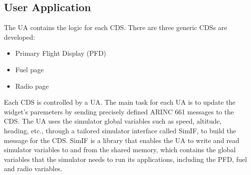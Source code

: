     \subsection{User Application}
        The UA contains the logic for each CDS. There are three generic CDSs are developed:
        \begin{itemize}
            \item Primary Flight Display (PFD)
            \item Fuel page
            \item Radio page
        \end{itemize}
        Each CDS is controlled by a UA. The main task for each UA is to update the widget's paremeters by sending precisely defined 
        ARINC 661 messages to the CDS. The UA uses the simulator global variables such as speed, altitude, heading, etc., through a 
        tailored simulator interface called SimIF, to build the message for the CDS. SimIF is a library that enables the UA to write 
        and read simulator variables to and from the shared memory, which contains the global variables that the simulator needs to 
        run its applications, including the PFD, fuel and radio variables.

